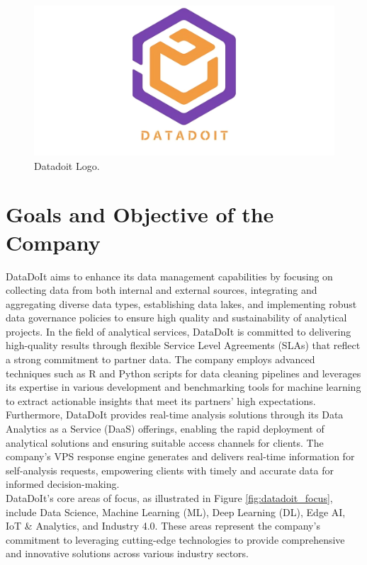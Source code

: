 \begin{figure}[htbp]
    \centering
    \includegraphics[width=0.5\linewidth]{Images/Datadoitlogo (2).png}
    \vspace{0.5cm}
    \caption{Datadoit Logo.}
    \label{fig:datadoit_logo}
\end{figure}

\section{Goals and Objective of the Company}

DataDoIt aims to enhance its data management capabilities by focusing on collecting data from both internal and external sources, integrating and aggregating diverse data types, establishing data lakes, and implementing robust data governance policies to ensure high quality and sustainability of analytical projects. In the field of analytical services, DataDoIt is committed to delivering high-quality results through flexible Service Level Agreements (SLAs) that reflect a strong commitment to partner data. The company employs advanced techniques such as R\cite{Rsoftware} and Python\cite{python3} scripts for data cleaning pipelines and leverages its expertise in various development and benchmarking tools for machine learning to extract actionable insights that meet its partners' high expectations. Furthermore, DataDoIt provides real-time analysis solutions through its Data Analytics as a Service (DaaS) offerings, enabling the rapid deployment of analytical solutions and ensuring suitable access channels for clients. The company's VPS response engine generates and delivers real-time information for self-analysis requests, empowering clients with timely and accurate data for informed decision-making.\\

\noindent DataDoIt's core areas of focus, as illustrated in Figure  \ref{fig:datadoit_focus}, include Data Science, Machine Learning (ML), Deep Learning (DL), Edge AI, IoT \& Analytics, and Industry 4.0. These areas represent the company's commitment to leveraging cutting-edge technologies to provide comprehensive and innovative solutions across various industry sectors.

